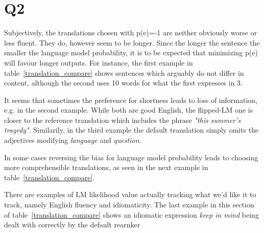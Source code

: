 \section*{Q2}

Subjectively, the translations chosen with p(e)=-1 are neither obviously worse or less fluent. They do, however seem to be longer. Since the longer the sentence the smaller the language model probability, it is to be expected that minimizing p(e) will favour longer outputs. For instance, the first example in table~\ref{translation_compare} shows sentences which arguably do not differ in content, although the second uses 10 words for what the first expresses in 3.

It seems that sometimes the preference for shortness leads to loss of information, e.g. in the second example. While both are good English, the flipped-LM one is closer to the reference translation which includes the phrase \textit{"this summer's tragedy"}. Similarily, in the third example the default translation simply omits the adjectives modifying \textit{language} and \textit{question}.

In some cases reversing the bias for language model probability leads to choosing more comprehensible translations, as seen in the next example in table~\ref{translation_compare}.

There are examples of LM likelihood value actually tracking what we'd like it to track, namely English fluency and idiomaticity. The last example in this section of table~\ref{translation_compare} shows an idiomatic expression \textit{keep in mind} being dealt with correctly by the default rearnker